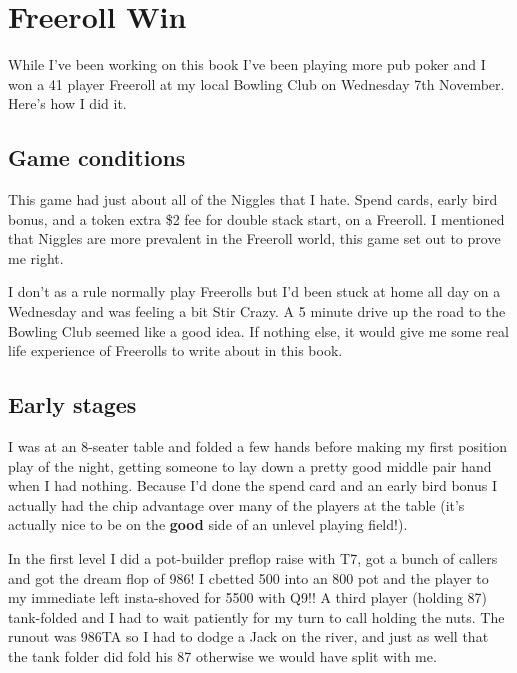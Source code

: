 \chapter{Freeroll Win}


While I've been working on this book I've been playing more
pub poker and I won a 41 player Freeroll at my local
Bowling Club on Wednesday 7th November. Here's how I
did it.


\section{Game conditions}

This game had just about all of the Niggles that I hate.
Spend cards, early bird bonus, and a token extra \$2 fee
for double stack start, on a Freeroll. I mentioned that
Niggles are more prevalent in the Freeroll world, this
game set out to prove me right.

I don't as a rule normally play Freerolls but I'd been stuck
at home all day on a Wednesday and was feeling a bit Stir Crazy.
A 5 minute drive up the road to the Bowling Club seemed like
a good idea. If nothing else, it would give me some real life
experience of Freerolls to write about in this book.


\section{Early stages}

I was at an 8-seater table and folded a few hands before
making my first position play of the night, getting someone
to lay down a pretty good middle pair hand when I had nothing.
Because I'd done the spend card and an early bird bonus I actually
had the chip advantage over many of the players at the table
(it's actually nice to be on the \textbf{good} side of an
unlevel playing field!). 

In the first level I did a pot-builder preflop raise with T7,
got a bunch of callers and got the dream flop of 986! I cbetted
500 into an 800 pot and the player to my immediate left
insta-shoved for 5500 with Q9!! A third player (holding 87) tank-folded
and I had to wait patiently for my turn to call holding the nuts.
The runout was 986TA so I had to dodge a Jack on the river,
and just as well that the tank folder did fold his 87 otherwise we
would have split with me.

